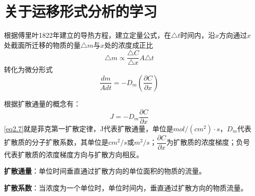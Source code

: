 \chapter{关于运移形式分析的学习}
根据傅里叶1822年建立的导热方程，建立定量公式，在$\triangle t$时间内，沿$x$方向通过$x$处截面所迁移的物质的量$\triangle m$与$x$处的浓度\textcolor[rgb]{1,0,0}{成正比}
\begin{equation*}
    \triangle m \propto \dfrac{\triangle C}{\triangle x} A \triangle t
\end{equation*}
转化为微分形式
\begin{equation*}
    \dfrac{dm}{Adt} = - D_m\left(\dfrac{\partial C}{\partial x}\right)
\end{equation*}


根据扩散通量的概念有：
\begin{equation}
    J = -D_m\dfrac{\partial C}{ \partial x}
    \label{eq2.7}
\end{equation}
\cref{eq2.7}就是\textcolor[rgb]{1,0,0}{菲克第一扩散定律}，J代表扩散通量，单位是$mol/(cm^2)\cdot s$，$D_m$代表扩散质的分子扩散系数，其单位是$cm^2/s$或$m^2/s$；$\dfrac{\partial C}{\partial x}$为扩散质的浓度梯度；负号代表扩散质的浓度梯度方向与扩散方向相反。

\textbf{\textcolor[rgb]{1,0,0}{扩散通量}}：单位时间垂直通过扩散方向的单位面积的物质的流量。

\textbf{\textcolor[rgb]{1,0,0}{扩散系数}}：当浓度为一个单位时，单位时间内，垂直通过扩散方向的物质流量。


